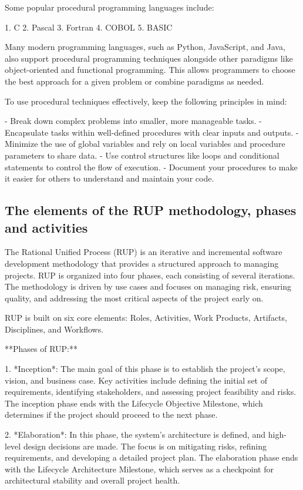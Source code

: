 \documentclass{article}
\begin{document}
Some popular procedural programming languages include:

1. C
2. Pascal
3. Fortran
4. COBOL
5. BASIC

Many modern programming languages, such as Python, JavaScript, and Java, also support procedural programming techniques alongside other paradigms like object-oriented and functional programming. This allows programmers to choose the best approach for a given problem or combine paradigms as needed.

To use procedural techniques effectively, keep the following principles in mind:

- Break down complex problems into smaller, more manageable tasks.
- Encapsulate tasks within well-defined procedures with clear inputs and outputs.
- Minimize the use of global variables and rely on local variables and procedure parameters to share data.
- Use control structures like loops and conditional statements to control the flow of execution.
- Document your procedures to make it easier for others to understand and maintain your code.


\subsection{The elements of the RUP methodology, phases and activities}

The Rational Unified Process (RUP) is an iterative and incremental software development methodology that provides a structured approach to managing projects. RUP is organized into four phases, each consisting of several iterations. The methodology is driven by use cases and focuses on managing risk, ensuring quality, and addressing the most critical aspects of the project early on.

RUP is built on six core elements: Roles, Activities, Work Products, Artifacts, Disciplines, and Workflows.

**Phases of RUP:**

1. *Inception*: The main goal of this phase is to establish the project's scope, vision, and business case. Key activities include defining the initial set of requirements, identifying stakeholders, and assessing project feasibility and risks. The inception phase ends with the Lifecycle Objective Milestone, which determines if the project should proceed to the next phase.

2. *Elaboration*: In this phase, the system's architecture is defined, and high-level design decisions are made. The focus is on mitigating risks, refining requirements, and developing a detailed project plan. The elaboration phase ends with the Lifecycle Architecture Milestone, which serves as a checkpoint for architectural stability and overall project health.
\end{document}
